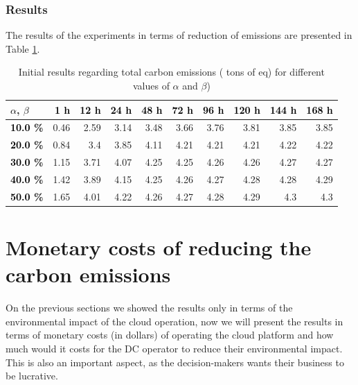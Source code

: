 \subsubsection{Results}

The results of the experiments in terms of reduction of  emissions are presented in Table \ref{tab:flex_scheduling}.

\begin{table}[H]
  \caption{Initial results regarding total carbon emissions ( tons of  eq) for different values of $\alpha$ and $\beta$)}\centering
       \label{tab:flex_scheduling}
\begin{tabular}{|l|r|r|r|r|r|r|r|r|r|}
\hline
\textcolor{black} {$\alpha$}, \textcolor{black}{$\beta$} &   \textcolor{black}{\textbf{ 1 h }} &  \textcolor{black}{\textbf{ 12 h }} &  \textcolor{black}{\textbf{ 24 h }} &  \textcolor{black}{\textbf{ 48 h }}  &   \textcolor{black}{\textbf{ 72 h}} &   \textcolor{black}{\textbf{ 96 h}} &   \textcolor{black}{\textbf{ 120 h }} &   \textcolor{black}{\textbf{ 144 h}} &   \textcolor{black}{\textbf{ 168 h}} \\ 
     \hline
 \textcolor{black}{ \textbf{10.0 \%}}   &  0.46 &  2.59 &  3.14 &  3.48 &  3.66 &  3.76 &  3.81 &  3.85 &  3.85 \\ 
\hline
 \textcolor{black}{ \textbf{20.0 \%}}   &  0.84 &  3.4 &  3.85 &  4.11 &  4.21 &  4.21 &  4.21 &  4.22 &  4.22 \\ 
\hline
 \textcolor{black}{ \textbf{30.0 \%}}   &  1.15 &  3.71 &  4.07 &  4.25 &  4.25 &  4.26 &  4.26 &  4.27 &  4.27 \\ 
\hline
 \textcolor{black}{ \textbf{40.0 \%}}   &  1.42 &  3.89 &  4.15 &  4.25 &  4.26 &  4.27 &  4.28 &  4.28 &  4.29 \\ 
\hline
 \textcolor{black}{ \textbf{50.0 \%}}   &  1.65 &  4.01 &  4.22 &  4.26 &  4.27 &  4.28 &  4.29 &  4.3 &  4.3 \\ 
\hline
\end{tabular}
\end{table}


\section{ Monetary costs of reducing the carbon emissions}

On the previous sections we showed the results only in terms of the environmental impact of the cloud operation, now we will present the results in terms of monetary costs (in dollars) of operating the cloud platform and how much would it costs for the DC operator to reduce their environmental impact. This is also an important aspect, as the decision-makers wants their business to be lucrative.

